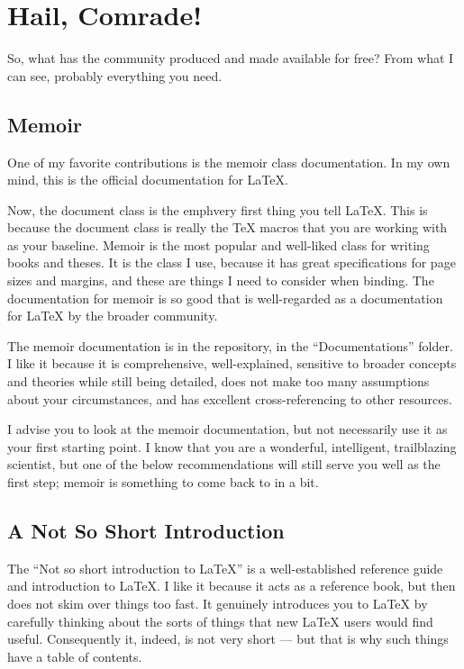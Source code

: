 \documentclass[12pt, oneside]{memoir}
\begin{document}
\section{Hail, Comrade!}
So, what has the community produced and made available for free? From what I can see, probably everything you need.\\

\subsection{Memoir}

One of my favorite contributions is the memoir class documentation. In my own mind, this is the official documentation for \LaTeX{}.

Now, the document class is the emph{very first thing} you tell \LaTeX{}. This is because the document class is really the \TeX{} macros that you are working with as your baseline. Memoir is the most popular and well-liked class for writing books and theses. It is the class I use, because it has great specifications for page sizes and margins, and these are things I need to consider when binding. The documentation for memoir is so good that is well-regarded as a documentation for \LaTeX{} by the broader community.

The memoir documentation is in the repository, in the  ``Documentations'' folder. I like it because it is comprehensive, well-explained, sensitive to broader concepts and theories while still being detailed, does not make too many assumptions about your circumstances, and has excellent cross-referencing to other resources.

I advise you to look at the memoir documentation, but not necessarily use it as your first starting point. I know that you are a wonderful, intelligent, trailblazing scientist, but one of the below recommendations will still serve you well as the first step; memoir is something to come back to in a bit.\\

\subsection{A Not So Short Introduction}

The ``Not so short introduction to \LaTeX{}'' is a well-established reference guide and introduction to \LaTeX{}. I like it because it acts as a reference book, but then does not skim over things too fast. It genuinely introduces you to \LaTeX{} by carefully thinking about the sorts of things that new \LaTeX{} users would find useful. Consequently it, indeed, is not very short — but that is why such things have a table of contents.
\end{document}
